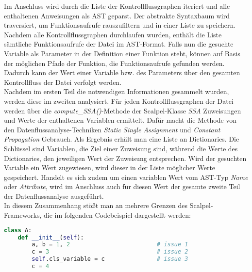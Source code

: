 \documentclass[german,bachelor]{swsLeipzig}
\begin{document}
Im Anschluss wird durch die Liste der Kontrollflussgraphen iteriert und alle enthaltenen Anweisungen als AST geparst.
Der abstrakte Syntaxbaum wird traversiert, um Funktionsaufrufe rauszufiltern und in einer Liste zu speichern.
Nachdem alle Kontrollflussgraphen durchlaufen wurden, enthält die Liste sämtliche Funktionsaufrufe der Datei im AST-Format.
Falls nun die gesuchte Variable als Parameter in der Definition einer Funktion steht, können auf Basis der möglichen Pfade
der Funktion, die Funktionsaufrufe gefunden werden.
Dadurch kann der Wert einer Variable bzw. des Parameters über den gesamten Kontrollfluss der Datei verfolgt werden.\\

Nachdem im ersten Teil die notwendigen Informationen gesammelt wurden, werden diese im zweiten analysiert.
Für jeden Kontrollflussgraphen der Datei werden über die \textit{compute\_SSA()}-Methode der Scalpel-Klasse \textit{SSA} Zuweisungen
und Werte der enthaltenen Variablen ermittelt.
Dafür macht die Methode von den Datenflussanalyse-Techniken \textit{Static Single Assignment} und \textit{Constant Propagation}
Gebrauch.
Als Ergebnis erhält man eine Liste an Dictionaries.
Die Schlüssel sind Variablen, die Ziel einer Zuweisung sind, während die Werte des Dictionaries, den jeweiligen Wert der Zuweisung
entsprechen.
Wird der gesuchten Variable ein Wert zugewiesen, wird dieser in der Liste möglicher Werte gespeichert.
Handelt es sich zudem um einen variablen Wert vom AST-Typ \textit{Name} oder \textit{Attribute}, wird im Anschluss auch für diesen Wert
der gesamte zweite Teil der Datenflussanalyse ausgeführt.\\

In diesem Zusammenhang stößt man an mehrere Grenzen des Scalpel-Frameworks, die im folgenden Codebeispiel dargestellt werden:\\
\begin{lstlisting}[language=Python, frame=single, basicstyle=\small]
class A:
    def __init__(self):
        a, b = 1, 2                         # issue 1
        c = 3                               # issue 2
        self.cls_variable = c               # issue 3
        c = 4
\end{lstlisting}
\
\end{document}
